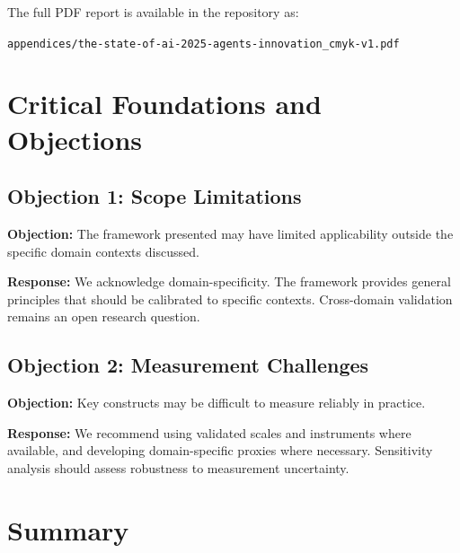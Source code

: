 The full PDF report is available in the repository as:

\texttt{appendices/the-state-of-ai-2025-agents-innovation\_cmyk-v1.pdf}



\section{Critical Foundations and Objections}
\label{sec:vvv7-foundations}

\subsection{Objection 1: Scope Limitations}

\textbf{Objection:} The framework presented may have limited applicability
outside the specific domain contexts discussed.

\textbf{Response:} We acknowledge domain-specificity. The framework provides
general principles that should be calibrated to specific contexts. Cross-domain
validation remains an open research question.

\subsection{Objection 2: Measurement Challenges}

\textbf{Objection:} Key constructs may be difficult to measure reliably in
practice.

\textbf{Response:} We recommend using validated scales and instruments where
available, and developing domain-specific proxies where necessary. Sensitivity
analysis should assess robustness to measurement uncertainty.





\section{Summary}
\label{sec:vvv7-summary}

